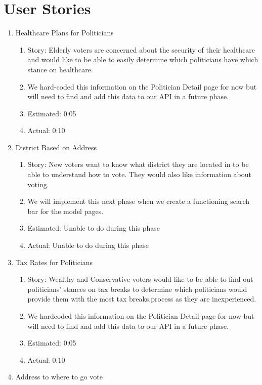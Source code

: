 \documentclass[11t]{article}
\begin{document}
\section{User Stories}
\begin{enumerate}
    \item Healthcare Plans for Politicians
    \begin{enumerate}
        \item Story: Elderly voters are concerned about the security of their healthcare and would like to be able to easily determine which politicians have which stance on healthcare.
        \item We hard-coded this information on the Politician Detail page for now but will need to find and add this data to our API in a future phase. 
        \item Estimated: 0:05
        \item Actual: 0:10
    \end{enumerate}
    \item District Based on Address
    \begin{enumerate}
        \item Story: New voters want to know what district they are located in to be able to understand how to vote. They would also like information about voting. 
        \item We will implement this next phase when we create a functioning search bar for the model pages.
        \item Estimated: Unable to do during this phase
        \item Actual: Unable to do during this phase
    \end{enumerate}
    \item Tax Rates for Politicians
    \begin{enumerate}
        \item Story: Wealthy and Conservative voters would like to be able to find out politicians’ stances on tax breaks to determine which politicians would provide them with the most tax breaks.process as they are inexperienced.
        \item We hardcoded this information on the Politician Detail page for now but will need to find and add this data to our API in a future phase. 
        \item Estimated: 0:05
        \item Actual: 0:10
    \end{enumerate}
    \item Address to where to go vote

\end{enumerate}
\end{document}
